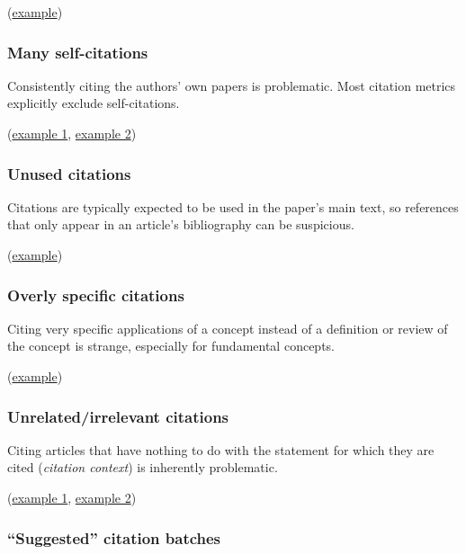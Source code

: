 \documentclass[letterpaper, 12pt]{article}
\begin{document}
(\href{https://pubpeer.com/publications/0C7C1F371CB05161EEACC303692521}{example})

\subsubsection*{Many self-citations}

Consistently citing the authors' own papers is problematic. Most citation metrics explicitly exclude self-citations.

(\href{https://pubpeer.com/publications/3EAC0C5735F8D48FF1D4B06C6BFC30}{example 1}, \href{https://pubpeer.com/publications/05FEFB3CB21AB7AE04EA800AAB28BF}{example 2})

\subsubsection*{Unused citations}

Citations are typically expected to be used in the paper's main text, so references that only appear in an article's bibliography can be suspicious.

(\href{https://pubpeer.com/publications/0C7E7F2703724338046FF2A0AA8392}{example})

\subsubsection*{Overly specific citations}

Citing very specific applications of a concept instead of a definition or review of the concept is strange, especially for fundamental concepts.

(\href{https://pubpeer.com/publications/5A064B2F4AE7F13D6E1F559F84492F}{example})

\subsubsection*{Unrelated/irrelevant citations}

Citing articles that have nothing to do with the statement for which they are cited (\emph{citation context}) is inherently problematic.

(\href{https://pubpeer.com/publications/B9CE2B145B02E439BA9C5B2C2D5F12}{example 1}, \href{https://pubpeer.com/publications/C21D670DD4C94B02C78809A55ED385}{example 2})

\subsubsection*{``Suggested'' citation batches}
\end{document}
